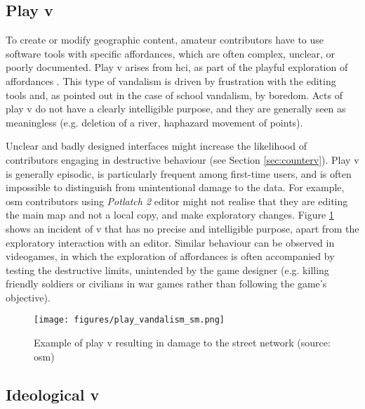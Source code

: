 \documentclass{article} \usepackage{graphicx,xspace}
\begin{document}
\subsection{Play \protect\gls{v}}

To create or modify geographic content, amateur contributors have to use software tools with specific affordances, which are often complex, unclear, or poorly documented. Play \gls{v} arises from \gls{hci}, as part of the playful exploration of affordances \citep{haklay:2010:interactinggeospatialtech}.
This type of vandalism is driven by frustration with the editing tools and, as pointed out in the case of school vandalism, by boredom.
Acts of play \gls{v} do not have a clearly intelligible purpose, and they are generally seen as meaningless (e.g. deletion of a river, haphazard movement of points).

Unclear and badly designed interfaces might increase the likelihood of contributors engaging in destructive behaviour (see Section \ref{sec:counterv}).
Play \gls{v} is generally episodic, is particularly frequent among first-time users, and is often impossible to distinguish from unintentional damage to the data. 
For example, \gls{osm} contributors using \emph{Potlatch 2} editor might not realise that they are editing the main map and not a local copy, and make exploratory changes.
Figure \ref{fig:osm_play_van} shows an incident of \gls{v} that has no precise and intelligible purpose, apart from the exploratory interaction with an editor.
Similar behaviour can be observed in videogames, in which the exploration of affordances is often accompanied by testing the destructive limits, unintended by the game designer (e.g. killing friendly soldiers or civilians in war games rather than following the game's objective).




\begin{figure}
\centering
\texttt{[image: figures/play\_vandalism\_sm.png]}
\caption{Example of play \gls{v} resulting in damage to the street network (source: \protect\gls{osm})}
\label{fig:osm_play_van}
\end{figure}

\subsection{Ideological \protect\gls{v}}
\end{document}
